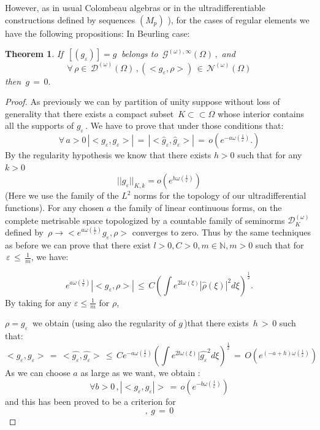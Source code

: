 \documentclass[12pt,a4paper]{amsart}
\newcommand{\NN}{\mathbb N}
\newtheorem{theorem}{Theorem}[section]
\begin{document}
  However, as in usual Colombeau algebras \cite{P.S.V.} or in the ultradifferentiable constructions  defined by  sequences $(M_p)$ \cite{P.R.S.Z}), for the cases of regular elements we have the following propositions:
  In Beurling case:
  \begin{theorem}
 
 
  If $\,[(g_\varepsilon)]=g\,$ belongs to 
  $\,\mathcal{G}^{(\omega),\infty}(\Omega)\,,$ 
  and 
  $$\, \forall \, \rho \in \,
   \mathcal{D}^{(\omega)}(\Omega) \, ,
   (<g_\varepsilon,\rho>) \,\in \,
   \mathcal{N}^{(\omega)}(\Omega)\,$$
    then $\,g\,=\,0 .$
    \end{theorem}
  \begin{proof}
  
  
  As previously we can by partition of unity suppose without loss of generality that there exists a compact subset $\,K \subset\subset \Omega$ whose interior contains all the supports of $g_\varepsilon \,.$
  We have to prove that under those conditions that:
  \begin{equation*}
  \forall\, a>0\, |<g_\varepsilon, g_\varepsilon>|\,=\,
  |<\hat{g}_\varepsilon,\hat{g}_\varepsilon>|\,=
  \,o(e^{-a\omega(\frac{1}{\varepsilon})}.)
  \end{equation*}
  By the regularity hypothesis we know that there exists 
  $h>0$ such that for any $k>0$
  $$||g_\varepsilon||_{K,k} =
   o(e^{h\omega(\frac{1}{\varepsilon})})$$
   (Here we use the family of the $L^2$ norms for the topology of our ultradifferential functions).
 For any chosen $a$ the family of linear continuous forms, on the complete metrisable space topologized by a countable family of seminorms 
  $\mathcal{D}_K^{(\omega)} $ defined by 
 $ \,\rho \rightarrow
  <e^{a\omega(\frac{1}{\varepsilon})}  g_\varepsilon, \rho> $ converges to zero.  Thus by the same techniques as before  
  we can prove that there exist $l>0, C>0,m \in \NN,m>0$
  such that for $\,\varepsilon\,\leq\,\frac{1}{m}$, we have:
  
 $$ e^{a\omega(\frac{1}{\varepsilon})}
  |< g_\varepsilon, \rho>| \,\leq\,
 C(\int e^{2l\omega(\xi)} |\hat{\rho}(\xi)|^2 d\xi)^{\frac{1}{2}} .$$
  By taking for any $\varepsilon\leq\frac{1}{m} $ for $\rho$,

 $ \rho = g_\varepsilon\, $ we obtain (using also the regularity of $g$\,)that there exists $\,h\,>\,0$ such that:
 \begin{equation*}
 <g_\varepsilon, g_\varepsilon > \,=\,
 < \hat{g_\varepsilon},\hat{g_\varepsilon}>\,\leq\,
 Ce^{-a\omega(\frac{1}{\varepsilon})}
(\int e^{2l\omega(\xi)}|\hat{g_\varepsilon}^2 d\xi )^
{\frac{1}{2}} \,=\,
O(e^{(-a+h)\omega(\frac{1}{\varepsilon })})
 \end{equation*}
  As we can choose $a$ as large as we want, we obtain :
  $$\forall b>0\,,|< g_\varepsilon,g_\varepsilon|> \,=\,
  o(e^{-b\omega(\frac{1}{\varepsilon })})$$
  and this has been proved to be a criterion for 
  $$,\ g\,=\,0$$
  \end{proof}
  
\end{document}
